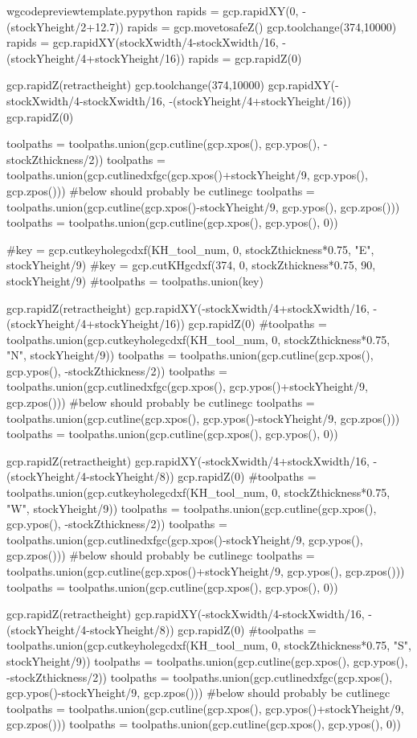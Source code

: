 \documentclass{ltxdoc}
\begin{document}
\begin{writecode}{w}{gcodepreviewtemplate.py}{python}
rapids = gcp.rapidXY(0, -(stockYheight/2+12.7))
rapids = gcp.movetosafeZ()
gcp.toolchange(374,10000)
rapids = gcp.rapidXY(stockXwidth/4-stockXwidth/16, -(stockYheight/4+stockYheight/16))
rapids = gcp.rapidZ(0)

gcp.rapidZ(retractheight)
gcp.toolchange(374,10000)
gcp.rapidXY(-stockXwidth/4-stockXwidth/16, -(stockYheight/4+stockYheight/16))
gcp.rapidZ(0)

toolpaths = toolpaths.union(gcp.cutline(gcp.xpos(), gcp.ypos(), -stockZthickness/2))
toolpaths = toolpaths.union(gcp.cutlinedxfgc(gcp.xpos()+stockYheight/9, gcp.ypos(), gcp.zpos()))
#below should probably be cutlinegc
toolpaths = toolpaths.union(gcp.cutline(gcp.xpos()-stockYheight/9, gcp.ypos(), gcp.zpos()))
toolpaths = toolpaths.union(gcp.cutline(gcp.xpos(), gcp.ypos(), 0))

#key = gcp.cutkeyholegcdxf(KH_tool_num, 0, stockZthickness*0.75, "E", stockYheight/9)
#key = gcp.cutKHgcdxf(374, 0, stockZthickness*0.75, 90, stockYheight/9)
#toolpaths = toolpaths.union(key)

gcp.rapidZ(retractheight)
gcp.rapidXY(-stockXwidth/4+stockXwidth/16, -(stockYheight/4+stockYheight/16))
gcp.rapidZ(0)
#toolpaths = toolpaths.union(gcp.cutkeyholegcdxf(KH_tool_num, 0, stockZthickness*0.75, "N", stockYheight/9))
toolpaths = toolpaths.union(gcp.cutline(gcp.xpos(), gcp.ypos(), -stockZthickness/2))
toolpaths = toolpaths.union(gcp.cutlinedxfgc(gcp.xpos(), gcp.ypos()+stockYheight/9, gcp.zpos()))
#below should probably be cutlinegc
toolpaths = toolpaths.union(gcp.cutline(gcp.xpos(), gcp.ypos()-stockYheight/9, gcp.zpos()))
toolpaths = toolpaths.union(gcp.cutline(gcp.xpos(), gcp.ypos(), 0))

gcp.rapidZ(retractheight)
gcp.rapidXY(-stockXwidth/4+stockXwidth/16, -(stockYheight/4-stockYheight/8))
gcp.rapidZ(0)
#toolpaths = toolpaths.union(gcp.cutkeyholegcdxf(KH_tool_num, 0, stockZthickness*0.75, "W", stockYheight/9))
toolpaths = toolpaths.union(gcp.cutline(gcp.xpos(), gcp.ypos(), -stockZthickness/2))
toolpaths = toolpaths.union(gcp.cutlinedxfgc(gcp.xpos()-stockYheight/9, gcp.ypos(), gcp.zpos()))
#below should probably be cutlinegc
toolpaths = toolpaths.union(gcp.cutline(gcp.xpos()+stockYheight/9, gcp.ypos(), gcp.zpos()))
toolpaths = toolpaths.union(gcp.cutline(gcp.xpos(), gcp.ypos(), 0))

gcp.rapidZ(retractheight)
gcp.rapidXY(-stockXwidth/4-stockXwidth/16, -(stockYheight/4-stockYheight/8))
gcp.rapidZ(0)
#toolpaths = toolpaths.union(gcp.cutkeyholegcdxf(KH_tool_num, 0, stockZthickness*0.75, "S", stockYheight/9))
toolpaths = toolpaths.union(gcp.cutline(gcp.xpos(), gcp.ypos(), -stockZthickness/2))
toolpaths = toolpaths.union(gcp.cutlinedxfgc(gcp.xpos(), gcp.ypos()-stockYheight/9, gcp.zpos()))
#below should probably be cutlinegc
toolpaths = toolpaths.union(gcp.cutline(gcp.xpos(), gcp.ypos()+stockYheight/9, gcp.zpos()))
toolpaths = toolpaths.union(gcp.cutline(gcp.xpos(), gcp.ypos(), 0))


\end{writecode}
\end{document}
